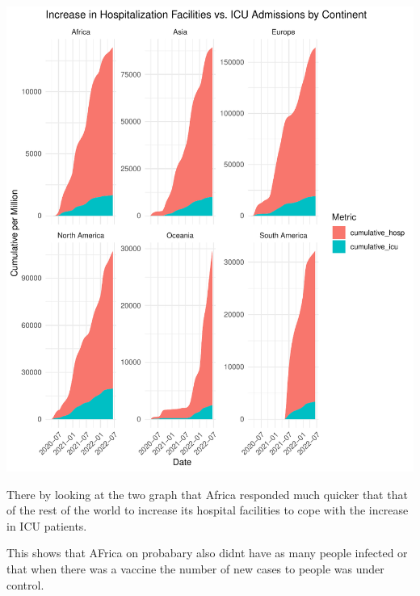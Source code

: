 \documentclass[12pt,preprint, authoryear]{elsarticle}
\let\origfigure\figure
\let\endorigfigure\endfigure
\renewenvironment{figure}[1][2] {
    \expandafter\origfigure\expandafter[H]
} {
    \endorigfigure
}
\numberwithin{equation}{section}
\numberwithin{figure}{section}
\numberwithin{table}{section}
\begin{document}
\begin{figure}

{\centering \includegraphics{Q1_files/figure-latex/Figure6-1} 

}

\caption{Hospitalization VS ICU Admissions  \label{Figure6}}\label{fig:Figure6}
\end{figure}

There by looking at the two graph that Africa responded much quicker
that that of the rest of the world to increase its hospital facilities
to cope with the increase in ICU patients.

This shows that AFrica on probabary also didnt have as many people
infected or that when there was a vaccine the number of new cases to
people was under control.

\begin{Shaded}
\begin{Highlighting}[]
\end{Highlighting}
\end{Shaded}
\end{document}
